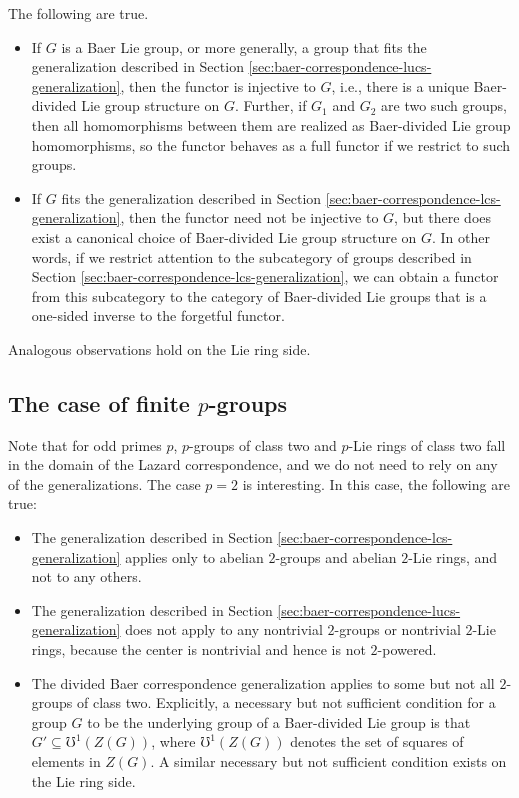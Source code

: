 The following are true.

\begin{itemize}
\item If $G$ is a Baer Lie group, or more generally, a group that fits
  the generalization described in Section
  \ref{sec:baer-correspondence-lucs-generalization}, then the functor
  is injective to $G$, i.e., there is a unique Baer-divided Lie group
  structure on $G$. Further, if $G_1$ and $G_2$ are two such groups,
  then all homomorphisms between them are realized as Baer-divided Lie
  group homomorphisms, so the functor behaves as a full functor if we
  restrict to such groups.
\item If $G$ fits the generalization described in Section
  \ref{sec:baer-correspondence-lcs-generalization}, then the functor
  need not be injective to $G$, but there does exist a canonical
  choice of Baer-divided Lie group structure on $G$. In other words,
  if we restrict attention to the subcategory of groups described in
  Section \ref{sec:baer-correspondence-lcs-generalization}, we can
  obtain a functor from this subcategory to the category of
  Baer-divided Lie groups that is a one-sided inverse to the forgetful
  functor.
\end{itemize}

Analogous observations hold on the Lie ring side.

\subsection{The case of finite $p$-groups}

Note that for odd primes $p$, $p$-groups of class two and $p$-Lie
rings of class two fall in the domain of the Lazard correspondence,
and we do not need to rely on any of the generalizations. The case $p
= 2$ is interesting. In this case, the following are true:

\begin{itemize}
\item The generalization described in Section
  \ref{sec:baer-correspondence-lcs-generalization} applies only to
  abelian $2$-groups and abelian $2$-Lie rings, and not to any others.
\item The generalization described in Section
  \ref{sec:baer-correspondence-lucs-generalization} does not apply to
  any nontrivial $2$-groups or nontrivial $2$-Lie rings, because the
  center is nontrivial and hence is not $2$-powered.
\item The divided Baer correspondence generalization applies to some
  but not all $2$-groups of class two. Explicitly, a necessary but not
  sufficient condition for a group $G$ to be the underlying group of a
  Baer-divided Lie group is that $G' \subseteq \mho^1(Z(G))$, where
  $\mho^1(Z(G))$ denotes the set of squares of elements in $Z(G)$. A
  similar necessary but not sufficient condition exists on the Lie
  ring side.
\end{itemize}

